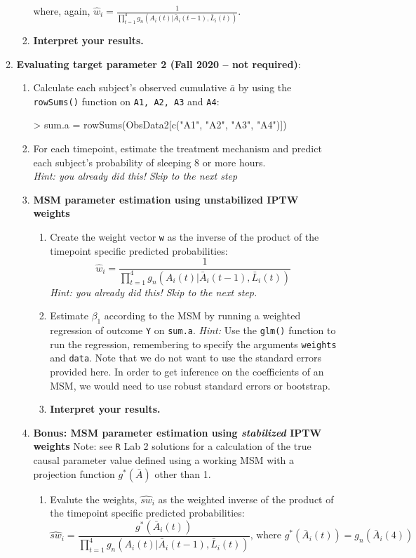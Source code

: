 \documentclass[answers]{exam}
\begin{document}
\begin{enumerate}
\begin{enumerate}
\begin{enumerate}
where, again, $\hat{w}_i = \frac{1}{\prod_{t=1}^4g_n(A_i(t)|\bar{A}_i(t-1), \bar{L}_i(t))}$. 
\item \textbf{Interpret your results.}
\end{enumerate}
\item \textbf{Evaluating target parameter 2 (Fall 2020 -- not required)}:
\begin{enumerate}
\item Calculate each subject's observed cumulative $\bar{a}$ by using the \texttt{rowSums()} function on \texttt{A1, A2, A3} and \texttt{A4}:
\begin{Schunk}
\begin{Sinput}
> sum.a = rowSums(ObsData2[c("A1", "A2", "A3", "A4")])
\end{Sinput}
\end{Schunk}
\item For each timepoint, estimate the treatment mechanism and predict each subject's probability of sleeping 8 or more hours.\\
\textit{Hint: you already did this! Skip to the next step}
\item \textbf{MSM parameter estimation using unstabilized IPTW weights}
\begin{enumerate}
\item Create the weight vector \texttt{w} as the inverse of the product of the timepoint specific predicted probabilities:
\[
\hat{w}_i = \frac{1}{\prod_{t=1}^4g_n(A_i(t)|\bar{A}_i(t-1), \bar{L}_i(t))} 
\]
\textit{Hint: you already did this! Skip to the next step.}
\item Estimate $\beta_1$ according to the MSM by running a weighted regression of outcome \texttt{Y} on \texttt{sum.a}.
\textit{Hint:} Use the \texttt{glm()} function to run the regression, remembering to specify the arguments \texttt{weights} and \texttt{data}. Note that we do not want to use the standard errors provided here. In order to get inference on the coefficients of an MSM, we would need to use robust standard errors or bootstrap.
\item \textbf{Interpret your results.}
\end{enumerate}
\item \textbf{Bonus: MSM parameter estimation using \textit{stabilized} IPTW weights} Note: see \texttt{R} Lab 2 solutions for a calculation of the true causal parameter value defined using a working MSM with a projection function $g^*(\bar{A})$ other than 1.
\begin{enumerate}
\item Evalute the weights, $\hat{sw}_i$ as the weighted inverse of the product of the timepoint specific predicted probabilities:
\[
\hat{sw}_i = \frac{g^*(\bar{A}_i(t))}{\prod_{t=1}^4g_n(A_i(t)|\bar{A}_i(t-1), \bar{L}_i(t))} \text{, where } g^*(\bar{A}_i(t)) = g_n(\bar{A}_i(4))
\]


\end{enumerate}
\end{enumerate}
\end{enumerate}
\end{enumerate}
\end{document}
